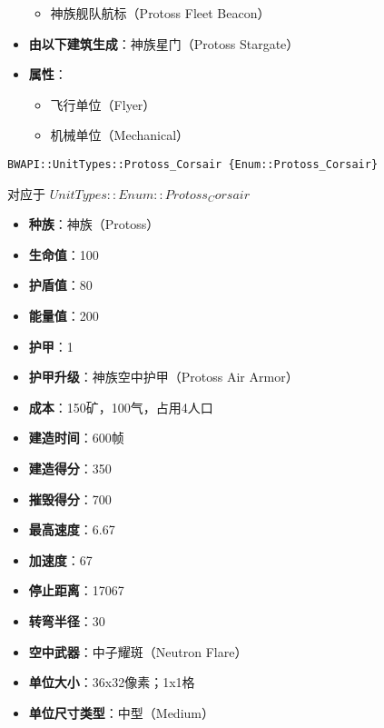 \begin{tcolorbox}[colback=white, colframe=black!60!white, title=Protoss\_Carrier(), arc=0mm]
\begin{itemize}
\begin{itemize}
                \item 神族舰队航标（Protoss Fleet Beacon）
            \end{itemize}
        \item \textbf{由以下建筑生成}：神族星门（Protoss Stargate）
        \item \textbf{属性}：
            \begin{itemize}
                \item 飞行单位（Flyer）
                \item 机械单位（Mechanical）
            \end{itemize}
    \end{itemize}
\end{tcolorbox}

\begin{tcolorbox}[colback=white, colframe=black!60!white, title=Protoss\_Corsair(), arc=0mm]
    \begin{verbatim}
BWAPI::UnitTypes::Protoss_Corsair {Enum::Protoss_Corsair}
    \end{verbatim}
    对应于  $ UnitTypes::Enum::Protoss_Corsair $ 
    \begin{itemize}
        \item \textbf{种族}：神族（Protoss）
        \item \textbf{生命值}：100
        \item \textbf{护盾值}：80
        \item \textbf{能量值}：200
        \item \textbf{护甲}：1
        \item \textbf{护甲升级}：神族空中护甲（Protoss Air Armor）
        \item \textbf{成本}：150矿，100气，占用4人口
        \item \textbf{建造时间}：600帧
        \item \textbf{建造得分}：350
        \item \textbf{摧毁得分}：700
        \item \textbf{最高速度}：6.67
        \item \textbf{加速度}：67
        \item \textbf{停止距离}：17067
        \item \textbf{转弯半径}：30
        \item \textbf{空中武器}：中子耀斑（Neutron Flare）
        \item \textbf{单位大小}：36x32像素；1x1格
        \item \textbf{单位尺寸类型}：中型（Medium）

\end{itemize}
\end{tcolorbox}
